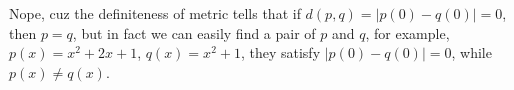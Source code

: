 \documentclass[11pt, a4paper, UTF8]{ctexart}
\begin{document}
\begin{solution}
  Nope, cuz the definiteness of metric tells that if $d(p,q) = |p(0) - q(0)| = 0$, 
  then $p = q$, but in fact we can easily find a pair of $p$ and $q$, 
  for example, $p(x) = x^{2} + 2x + 1$, $q(x) = x^{2} + 1$, they satisfy 
  $|p(0) - q(0)| = 0$, while $p(x) \neq q(x)$.
\end{solution}






\beginattch

\begin{problem}[UD: 23.3]
  
\end{problem}

\begin{attachment}
\end{attachment}

\end{document}
